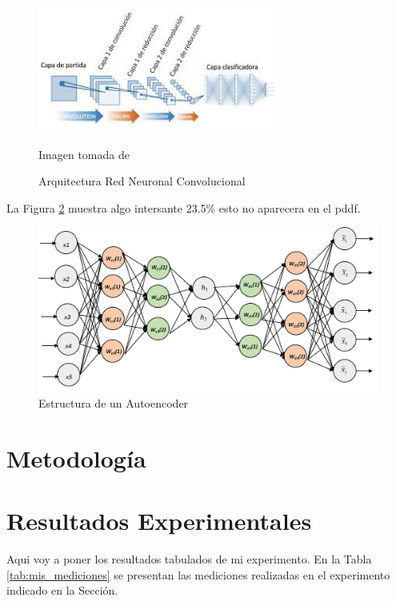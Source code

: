\documentclass[12pt]{report} %
\begin{document}
\begin{figure}[h!]
    \centering
    \includegraphics[width=0.7\textwidth]{imagenes/convnet.jpeg}
    \caption{Arquitectura Red Neuronal Convolucional}
    \footnotesize{Imagen tomada de \textcite[Capítulo 1, pág. 23]{nogueira2017image}}
    \label{fig:arquitecturaRedConv}
\end{figure}

\lipsum[3] La Figura \ref{fig:autoencoder_Estructura} muestra algo intersante \parencite{alberti2018} 23.5\% esto no aparecera en el pddf.

\begin{figure}[h!]
    \centering
    \includegraphics[width=\textwidth]{imagenes/autoencoder.png}
    \caption{Estructura de un Autoencoder}
    \label{fig:autoencoder_Estructura}
\end{figure}

\section{Metodología}
\lipsum[1-4]
\newpage
\section{Resultados Experimentales}
Aqui voy a poner los resultados tabulados de mi experimento. En la Tabla \ref{tab:mis_mediciones} se presentan las mediciones realizadas en el experimento indicado en la Sección.
\end{document}
